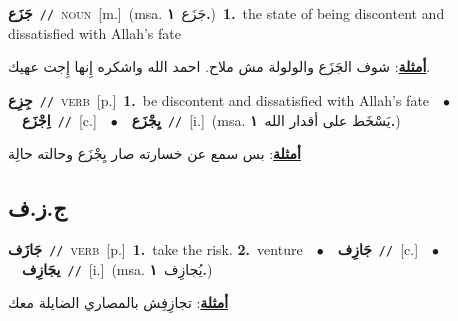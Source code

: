 \documentclass[10pt,a4paper,twoside]{article} %
\begin{document}
\begin{multicols}{2}
{\setlength\topsep{0pt}\textbf{\foreignlanguage{arabic}{جَزَع}}\ {\color{gray}\texttt{//}\color{black}}\ \textsc{noun}\ [m.]\ \color{gray}(msa. \foreignlanguage{arabic}{جَزَع}~\foreignlanguage{arabic}{\textbf{١.}})\color{black}\ \textbf{1.}~the state of being discontent and dissatisfied with Allah's fate\  \begin{flushright}\color{gray}\foreignlanguage{arabic}{\textbf{\underline{\foreignlanguage{arabic}{أمثلة}}}: شوف الجَزَع والولولة مش ملاح. احمد الله واشكره إِنها إِجت عهيك.}\end{flushright}\color{black}} \vspace{2mm}

{\setlength\topsep{0pt}\textbf{\foreignlanguage{arabic}{جِزِع}}\ {\color{gray}\texttt{//}\color{black}}\ \textsc{verb}\ [p.]\ \textbf{1.}~be discontent and dissatisfied with Allah's fate\ \ $\bullet$\ \ \setlength\topsep{0pt}\textbf{\foreignlanguage{arabic}{اِجْزَع}}\ {\color{gray}\texttt{//}\color{black}}\ [c.]\ \ $\bullet$\ \ \setlength\topsep{0pt}\textbf{\foreignlanguage{arabic}{يِجْزَع}}\ {\color{gray}\texttt{//}\color{black}}\ [i.]\ \color{gray}(msa. \foreignlanguage{arabic}{يَسْخَط على أقدار الله}~\foreignlanguage{arabic}{\textbf{١.}})\color{black}\  \begin{flushright}\color{gray}\foreignlanguage{arabic}{\textbf{\underline{\foreignlanguage{arabic}{أمثلة}}}: بس سمع عن خسارته صار يِجْزَع وحالته حالِة}\end{flushright}\color{black}} \vspace{2mm}

\vspace{-3mm}
\subsection*{\color{blue}\foreignlanguage{arabic}{ج.ز.ف}\color{blue}{}} 

{\setlength\topsep{0pt}\textbf{\foreignlanguage{arabic}{جَازَف}}\ {\color{gray}\texttt{//}\color{black}}\ \textsc{verb}\ [p.]\ \textbf{1.}~take the risk.  \textbf{2.}~venture\ \ $\bullet$\ \ \setlength\topsep{0pt}\textbf{\foreignlanguage{arabic}{جَازِف}}\ {\color{gray}\texttt{//}\color{black}}\ [c.]\ \ $\bullet$\ \ \setlength\topsep{0pt}\textbf{\foreignlanguage{arabic}{يجَازِف}}\ {\color{gray}\texttt{//}\color{black}}\ [i.]\ \color{gray}(msa. \foreignlanguage{arabic}{يُجازِف}~\foreignlanguage{arabic}{\textbf{١.}})\color{black}\  \begin{flushright}\color{gray}\foreignlanguage{arabic}{\textbf{\underline{\foreignlanguage{arabic}{أمثلة}}}: تجازِفِش بالمصاري الضايلة معك}\end{flushright}\color{black}} \vspace{2mm}


\end{multicols}
\end{document}
